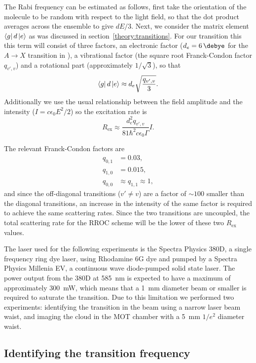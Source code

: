 The Rabi frequency can be estimated as follows, first take the orientation of
the molecule to be random with respect to the light field, so that the dot
product averages across the ensemble to give $dE/3$. Next, we consider the
matrix element $\bra{g}d\ket{e}$ as was discussed in
section~\ref{theory:transitions}. For our transition this this term will
consist of three factors, an electronic factor ($d_e=\SI{6}{\debye}$ for the
$A\rightarrow X$ transition in \CaF{}), a vibrational factor (the square root
Franck-Condon factor $q_{v',v}$) and a rotational part (approximately
$1/\sqrt{3}$), so that
%
\begin{equation}
  \bra{g}d\ket{e} \approx d_e\sqrt{\frac{q_{v', v}}{3}}.
\end{equation}
%
Additionally we use the usual relationship between the field amplitude and the
intensity ($I=c\epsilon_0E^2/2$) so the excitation rate is
%
\begin{equation}
  R_\text{ex} \approx \frac{d_e^2 q_{v',v}}{81 \hbar^2 c \epsilon_0 \Gamma}I.
\end{equation}

The relevant Franck-Condon factors are
%
\begin{align}
  q_{0,1} &= 0.03,\\
  q_{1,0} &= 0.015,\\
  q_{0,0} &\approx q_{1,1} \approx 1,
\end{align}
%
and since the off-diagonal transitions ($v' \neq v$) are a factor of $\sim100$
smaller than the diagonal transitions, an increase in the intensity of the same
factor is required to achieve the same scattering rates. Since the two
transitions are uncoupled, the total scattering rate for the RROC scheme will
be the lower of these two $R_\text{ex}$ values.

The  laser used for the following experiments is the Spectra
Physics 380D, a single frequency ring dye laser, using Rhodamine 6G dye and
pumped by a Spectra Physics Millenia EV, a continuous wave diode-pumped solid
state laser. The power output from the 380D at \SI{585}{\nano\meter} is
expected to have a maximum of approximately \SI{300}{\milli\watt}, which means
that a \SI{1}{\milli\meter} diameter beam or smaller is required to saturate
the transition.  Due to this limitation we performed two experiments:
identifying the transition in the \CaF{} beam using a narrow laser beam waist,
and imaging the \CaF{} cloud in the MOT chamber with a \SI{5}{\milli\meter}
$1/e^2$ diameter waist.

\subsection{Identifying the transition frequency}

